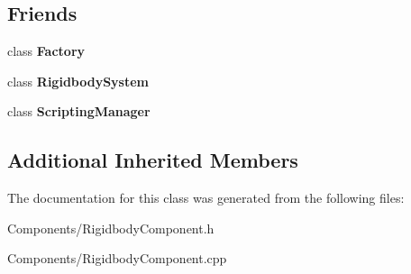 \subsection*{Friends}
\begin{DoxyCompactItemize}
\item 
\mbox{\label{classRigidbodyComponent_a328c093d609680cca505905c6d49901a}} 
class {\bfseries Factory}
\item 
\mbox{\label{classRigidbodyComponent_a55a81cc4c29d94c4266e29a2e459bc1e}} 
class {\bfseries Rigidbody\+System}
\item 
\mbox{\label{classRigidbodyComponent_ab3d6fafb2064bace492fd6b503d044f4}} 
class {\bfseries Scripting\+Manager}
\end{DoxyCompactItemize}
\subsection*{Additional Inherited Members}


The documentation for this class was generated from the following files\+:\begin{DoxyCompactItemize}
\item 
Components/Rigidbody\+Component.\+h\item 
Components/Rigidbody\+Component.\+cpp\end{DoxyCompactItemize}
